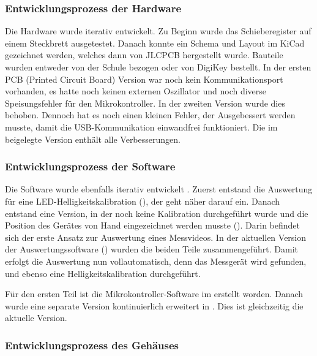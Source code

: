 \subsubsection{Entwicklungsprozess der Hardware}

Die Hardware wurde iterativ entwickelt.
Zu Beginn wurde das Schieberegister auf einem Steckbrett ausgetestet.
Danach konnte ein Schema und Layout im KiCad gezeichnet werden, welches dann von JLCPCB \cite{jlc} hergestellt wurde.
Bauteile wurden entweder von der Schule bezogen oder von DigiKey \cite{digikey} bestellt.
In der ersten PCB (Printed Circuit Board) Version war noch kein Kommunikationsport vorhanden, es hatte noch keinen externen Oszillator und noch diverse Speisungsfehler für den Mikrokontroller.
In der zweiten Version wurde dies behoben. Dennoch hat es noch einen kleinen Fehler, der Ausgebessert werden musste, damit die USB-Kommunikation einwandfrei funktioniert.
Die im  beigelegte Version enthält alle Verbesserungen.

\subsubsection{Entwicklungsprozess der Software}

Die Software wurde ebenfalls iterativ entwickelt \cite{stackoverflow,stackexchange,mathexchange,geeks}.
Zuerst entstand die Auswertung für eine LED-Helligkeitskalibration (), der  geht näher darauf ein.
Danach entstand eine Version, in der noch keine Kalibration durchgeführt wurde und die Position des Gerätes von Hand eingezeichnet werden musste ().
Darin befindet sich der erste Ansatz zur Auswertung eines Messvideos.
In der aktuellen Version der Auswertungssoftware () wurden die beiden Teile zusammengeführt.
Damit erfolgt die Auswertung nun vollautomatisch, denn das Messgerät wird gefunden, und ebenso eine Helligkeitskalibration durchgeführt.

Für den ersten Teil ist die Mikrokontroller-Software im  erstellt worden.
Danach wurde eine separate Version kontinuierlich erweitert in .
Dies ist gleichzeitig die aktuelle Version.



\subsubsection{Entwicklungsprozess des Gehäuses}

